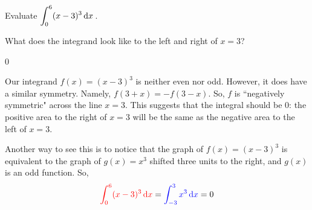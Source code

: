 \begin{question}
Evaluate $\displaystyle\int_{0}^6 (x-3)^3\,\mathrm{d}x$\,.
\end{question}
\begin{hint}
What does the integrand look like to the left and right of $x=3$?
\end{hint}
\begin{answer}
0
\end{answer}
\begin{solution}
Our integrand $f(x)=(x-3)^3$ is neither even nor odd. However, it does have a similar symmetry. Namely, $f(3+x)=-f(3-x)$. So, $f$ is ``negatively symmetric" across the line $x=3$. This suggests that the integral should be 0: the positive area to the right of $x=3$ will be the same as the negative area to the left of $x=3$.

Another way to see this is to notice that the graph of $f(x)=(x-3)^3$ is equivalent to the graph of $g(x)=x^3$ shifted three units to the right, and $g(x)$ is an odd function. So,
\[\textcolor{red}{\int_{0}^6 (x-3)^3\,\mathrm{d}x} = \textcolor{blue}{\int_{-3}^3 x^3\,\mathrm{d}x}=0\]

\begin{center}
\end{center}
\end{solution}


